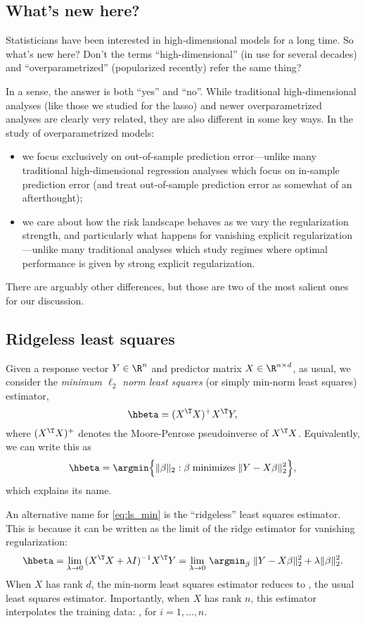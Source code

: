\documentclass{article}
\begin{document}
\subsection{What's new here?}

Statisticians have been interested in high-dimensional models for a long
time. So what's new here? Don't the terms ``high-dimensional'' (in use for
several decades) and ``overparametrized'' (popularized recently) refer the same
thing?    

In a sense, the answer is both ``yes'' and ``no''. While traditional
high-dimensional analyses (like those we studied for the lasso) and newer
overparametrized analyses are clearly very related, they are also different in
some key ways. In the study of overparametrized models:
\begin{itemize}
\item we focus exclusively on out-of-sample prediction error---unlike many 
  traditional high-dimensional regression analyses which focus on in-sample
  prediction error (and treat out-of-sample prediction error as somewhat of an 
  afterthought);  
\item we care about how the risk landscape behaves as we vary the regularization  
  strength, and particularly what happens for vanishing explicit
  regularization---unlike many traditional analyses which study regimes where
  optimal performance is given by strong explicit regularization.   
\end{itemize}
There are arguably other differences, but those are two of the most salient ones 
for our discussion.

\subsection{Ridgeless least squares}

Given a response vector $Y \in \R^n$ and predictor matrix $X \in \R^{n \times
  d}$, as usual, we consider the \emph{minimum $\ell_2$ norm least squares} 
(or simply min-norm least squares) estimator,
\begin{equation}
\label{eq:ls_min}
\hbeta = (X^\T X)^+ X^\T Y,
\end{equation}
where $(X^\T X)^+$ denotes the Moore-Penrose pseudoinverse of $X^\T X$.
Equivalently, we can write this as
\[
\hbeta = \argmin \Big\{ \|\beta\|_2 : \beta \; \text{minimizes} \; \|Y - X
\beta\|_2^2 \Big\},   
\]
which explains its name.  

An alternative name for \eqref{eq:ls_min} is the ``ridgeless'' least squares
estimator. This is because it can be written as the limit of the ridge estimator
for vanishing regularization:  
\[
\hbeta = \lim_{\lambda \to 0} \, (X^\T X + \lambda I)^{-1} X^\T Y =   
\lim_{\lambda \to 0} \, \argmin_\beta \; \|Y - X\beta\|_2^2 + \lambda 
\|\beta\|_2^2.   
\]
When $X$ has rank $d$, the min-norm least squares estimator reduces to
, the usual least squares estimator.
Importantly, when $X$ has rank $n$, this estimator interpolates the training 
data: , for $i=1,\dots,n$.   
\end{document}
